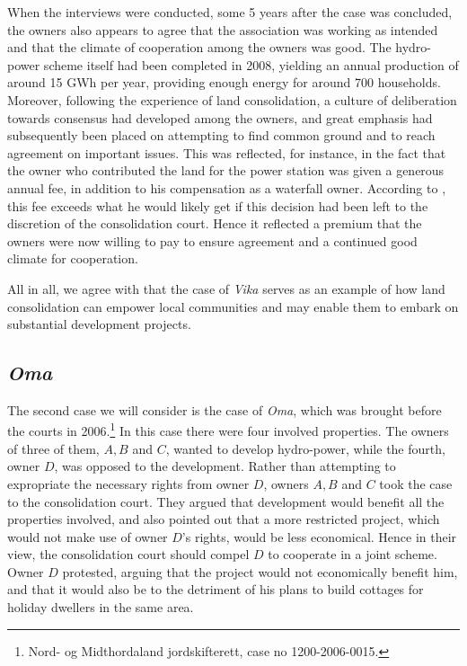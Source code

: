 When the interviews were conducted, some 5 years after the case was concluded, the owners also appears to agree that the association was working as intended and that the climate of cooperation among the owners was good. The hydro-power scheme itself had been completed in 2008, yielding an annual production of around 15 GWh per year, providing enough energy for around 700 households. Moreover, following the experience of land consolidation, a culture of deliberation towards consensus had developed among the owners, and great emphasis had subsequently been placed on attempting to find common ground and to reach agreement on important issues. This was reflected, for instance, in the fact that the owner who contributed the land for the power station was given a generous annual fee, in addition to his compensation as a waterfall owner. According to \cite{master}, this fee exceeds what he would likely get if this decision had been left to the discretion of the consolidation court. Hence it reflected a premium that the owners were now willing to pay to ensure agreement and a continued good climate for cooperation.

All in all, we agree with \cite{master} that the case of \emph{Vika} serves as an example of how land consolidation can empower local communities and may enable them to embark on substantial development projects.

\subsection{\emph{Oma}}

The second case we will consider is the case of \emph{Oma}, which was brought before the courts in 2006.\footnote{Nord- og Midthordaland jordskifterett, case no 1200-2006-0015.} In this case there were four involved properties. The owners of three of them, $A,B$ and $C$, wanted to develop hydro-power, while the fourth, owner $D$, was opposed to the development. Rather than attempting to expropriate the necessary rights from owner $D$, owners $A,B$ and $C$ took the case to the consolidation court. They argued that development would benefit all the properties involved, and also pointed out that a more restricted project, which would not make use of owner $D$'s rights, would be less economical. Hence in their view, the consolidation court should compel $D$ to cooperate in a joint scheme. Owner $D$ protested, arguing that the project would not economically benefit him, and that it would also be to the detriment of his plans to build cottages for holiday dwellers in the same area.

